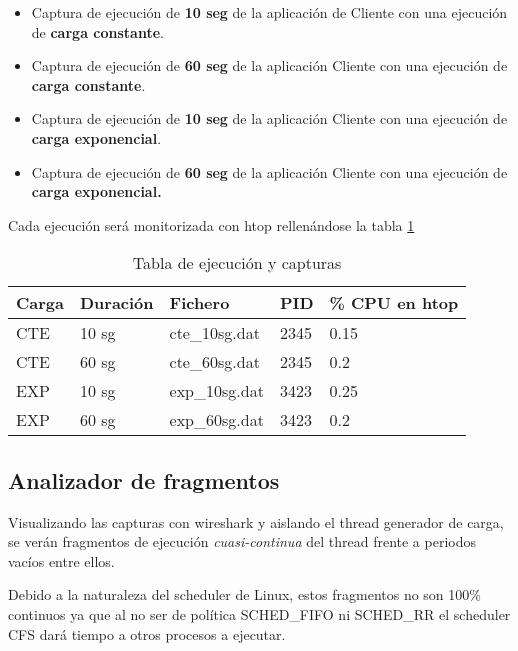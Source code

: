 \documentclass[a4paper,11pt,spanish,twoside]{article}
\begin{document}
\begin{itemize}
\item Captura de ejecución de \textbf{10 seg} de la aplicación de
  Cliente con una ejecución de \textbf{carga constante}.

\item Captura de ejecución de \textbf{60 seg} de la aplicación Cliente
  con una ejecución de \textbf{carga constante}.

\item Captura de ejecución de \textbf{10 seg} de la aplicación Cliente
  con una ejecución de \textbf{carga exponencial}.

\item Captura de ejecución de \textbf{60 seg} de la aplicación Cliente
  con una ejecución de \textbf{carga exponencial.}
\end{itemize}

Cada ejecución será monitorizada con htop rellenándose la tabla \ref{tab:capturas}

\begin{table}[h!]
  \centering
  \begin{tabular}{p{1in}|p{1in}|p{1in}|p{1in}|p{1in}}
    \textbf{Carga} & \textbf{Duración} & \textbf{Fichero} &
    \textbf{PID} & \textbf{\% CPU en htop} \\ \hline
CTE & 10 sg & cte\_10sg.dat & 2345 & 0.15 \\
CTE & 60 sg & cte\_60sg.dat & 2345 & 0.2 \\
EXP & 10 sg & exp\_10sg.dat & 3423 & 0.25 \\
EXP & 60 sg & exp\_60sg.dat & 3423 & 0.2 \\


\end{tabular}
  \caption{Tabla de ejecución y capturas}
  \label{tab:capturas}
\end{table}

\subsection{Analizador de fragmentos}
\label{sec:anacapturas}

Visualizando las capturas con wireshark y aislando el thread generador
de carga, se verán fragmentos de ejecución \emph{cuasi-continua} del
thread frente a periodos vacíos entre ellos.

Debido a la naturaleza del scheduler de Linux, estos fragmentos no son
100\% continuos ya que al no ser de política SCHED\_FIFO ni SCHED\_RR
el scheduler CFS dará tiempo a otros procesos a ejecutar.
\end{document}
